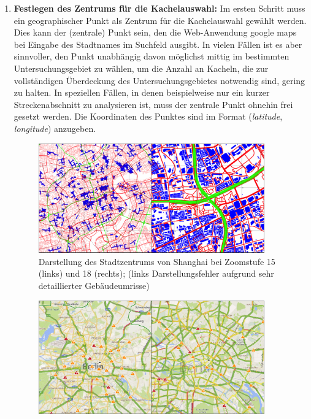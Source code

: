 \begin{enumerate}
\item \textbf{Festlegen des Zentrums für die Kachelauswahl:} Im ersten Schritt muss ein geographischer Punkt als Zentrum für die Kachelauswahl gewählt werden. Dies kann der (zentrale) Punkt sein, den die Web-Anwendung google maps bei Eingabe des Stadtnames im Suchfeld ausgibt. In vielen Fällen ist es aber sinnvoller, den Punkt unabhängig davon möglichst mittig im bestimmten  Untersuchungsgebiet zu wählen, um die Anzahl an Kacheln, die zur vollständigen Überdeckung des Untersuchungsgebietes notwendig sind, gering zu halten. In speziellen Fällen, in denen beispielweise nur ein kurzer Streckenabschnitt zu analysieren ist, muss der zentrale Punkt ohnehin frei gesetzt werden. Die Koordinaten des Punktes sind im Format (\textit{latitude}, \textit{longitude}) anzugeben.
%
\begin{figure}
  \centering
    \includegraphics[width=0.92\textwidth]{images/3_Shanghai_Problem_Datenaufloesung}
    \caption{Darstellung des Stadtzentrums von Shanghai bei Zoomstufe 15 (links) und 18 (rechts); (links Darstellungsfehler aufgrund sehr detaillierter Gebäudeumrisse)}
    \label{fig:Fehler_Shanghai}
\end{figure}
%
%
\begin{figure}
  \centering
    \includegraphics[width=0.92\textwidth]{images/3_bing_Aufloesung_traffic}

\end{figure}
\end{enumerate}
